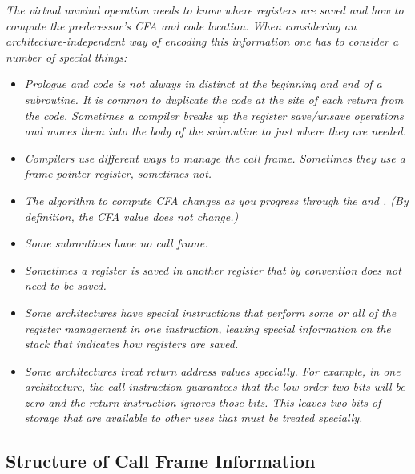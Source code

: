 \textit{The virtual unwind 
operation needs to know where registers are
saved and how to compute the predecessor\textquoteright{s} CFA and code
location. When considering an architecture-independent way
of encoding this information one has to consider a number of
special things:}

\begin{itemize} %

\item \textit{Prologue 
and 
 code is not always in 
distinct 
at the beginning and end of a subroutine. It is common
to duplicate the  code 
at the site of each return
from the code. Sometimes a compiler breaks up the register
save/unsave operations and moves them into the body of the
subroutine to just where they are needed.}


\item \textit{Compilers use different ways to manage the call
frame. Sometimes they use a frame pointer register, sometimes
not.}

\item \textit{The algorithm to compute CFA changes as you progress through
the  
and . 
(By definition, the CFA value
does not change.)}

\item \textit{Some subroutines have no call frame.}

\item \textit{Sometimes a register is saved in another register that by
convention does not need to be saved.}

\item \textit{Some architectures have special instructions that perform
some or all of the register management in one instruction,
leaving special information on the stack that indicates how
registers are saved.}

\item \textit{Some architectures treat return address values specially. For
example, in one architecture, the call instruction guarantees
that the low order two bits will be zero and the return
instruction ignores those bits. This leaves two bits of
storage that are available to other uses that must be treated
specially.}

\end{itemize}


\subsection{Structure of Call Frame Information}
\label{chap:structureofcallframeinformation}

